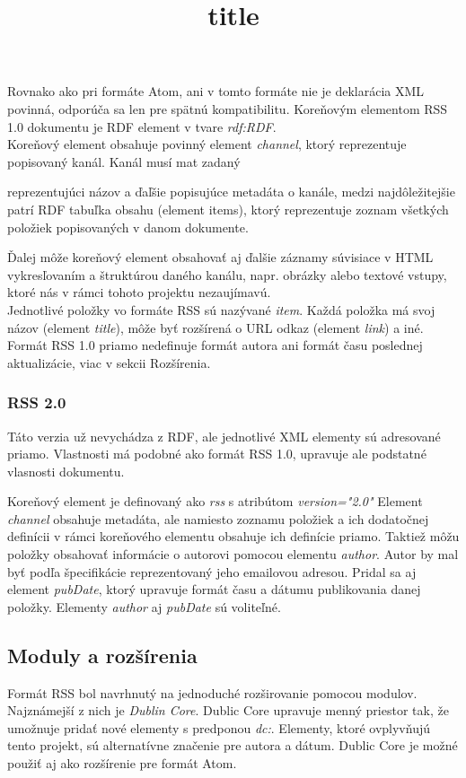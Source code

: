 \documentclass[11pt,a4paper]{article}
\begin{document}
Rovnako ako pri formáte Atom, ani v tomto formáte nie je deklarácia XML povinná, odporúča sa len pre spätnú kompatibilitu. Koreňovým elementom RSS 1.0 dokumentu je RDF element v tvare \textit{rdf:RDF}.\\

Koreňový element obsahuje povinný element \textit{channel}, ktorý reprezentuje popisovaný kanál. Kanál musí mat zadaný \title{title} reprezentujúci názov a ďaľšie popisujúce metadáta o kanále, medzi najdôležitejšie patrí RDF tabuľka obsahu (element items), ktorý reprezentuje zoznam všetkých položiek popisovaných v danom dokumente.

Ďalej môže koreňový element obsahovať aj ďalšie záznamy súvisiace v HTML vykresľovaním a štruktúrou daného kanálu, napr. obrázky alebo textové vstupy, ktoré nás v rámci tohoto projektu nezaujímavú.\\

Jednotlivé položky vo formáte RSS sú nazývané \textit{item}. Každá položka má svoj názov (element \textit{title}), môže byť rozšírená o URL odkaz (element \textit{link}) a iné.
Formát RSS 1.0 priamo nedefinuje formát autora ani formát času poslednej aktualizácie, viac v sekcii Rozšírenia.

\subsubsection{RSS 2.0}

Táto verzia už nevychádza z RDF, ale jednotlivé XML elementy sú adresované priamo.
Vlastnosti má podobné ako formát RSS 1.0, upravuje ale podstatné vlasnosti dokumentu.

Koreňový element je definovaný ako \textit{rss} s atribútom \textit{version="2.0"}
Element \textit{channel} obsahuje metadáta, ale namiesto zoznamu položiek a ich dodatočnej definícii v rámci koreňového elementu obsahuje ich definície priamo. Taktiež môžu položky obsahovať informácie o autorovi pomocou elementu \textit{author}. Autor by mal byť podľa špecifikácie reprezentovaný jeho emailovou adresou. Pridal sa aj element \textit{pubDate}, ktorý upravuje formát času a dátumu publikovania danej položky. Elementy \textit{author} aj \textit{pubDate} sú voliteľné.

\subsection{Moduly a rozšírenia}

Formát RSS bol navrhnutý na jednoduché rozširovanie pomocou modulov. Najznámejší z nich je \textit{Dublin Core}. Dublic Core upravuje menný priestor tak, že umožnuje pridať nové elementy s predponou \textit{dc:}. Elementy, ktoré ovplyvňujú tento projekt, sú alternatívne značenie pre autora a dátum. Dublic Core je možné použiť aj ako rozšírenie pre formát Atom.
\end{document}
